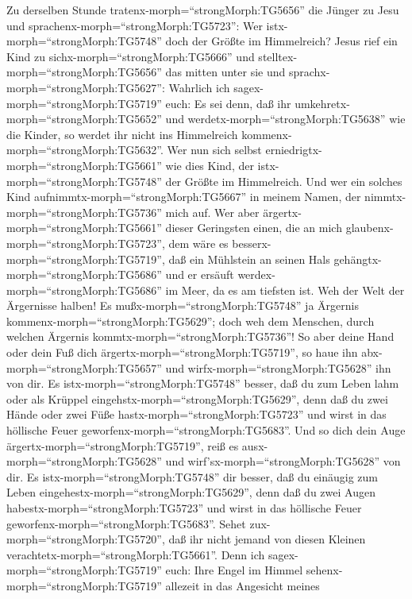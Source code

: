  Zu derselben Stunde tratenx-morph=``strongMorph:TG5656''
die Jünger zu Jesu und sprachenx-morph=``strongMorph:TG5723'': Wer
istx-morph=``strongMorph:TG5748'' doch der Größte im Himmelreich?
 Jesus rief ein Kind zu sichx-morph=``strongMorph:TG5666''
und stelltex-morph=``strongMorph:TG5656'' das mitten unter sie
 und sprachx-morph=``strongMorph:TG5627'': Wahrlich ich
sagex-morph=``strongMorph:TG5719'' euch: Es sei denn, daß ihr
umkehretx-morph=``strongMorph:TG5652'' und
werdetx-morph=``strongMorph:TG5638'' wie die Kinder, so werdet ihr nicht
ins Himmelreich kommenx-morph=``strongMorph:TG5632''.  Wer
nun sich selbst erniedrigtx-morph=``strongMorph:TG5661'' wie dies Kind,
der istx-morph=``strongMorph:TG5748'' der Größte im Himmelreich.
 Und wer ein solches Kind
aufnimmtx-morph=``strongMorph:TG5667'' in meinem Namen, der
nimmtx-morph=``strongMorph:TG5736'' mich auf.  Wer aber
ärgertx-morph=``strongMorph:TG5661'' dieser Geringsten einen, die an
mich glaubenx-morph=``strongMorph:TG5723'', dem wäre es
besserx-morph=``strongMorph:TG5719'', daß ein Mühlstein an seinen Hals
gehängtx-morph=``strongMorph:TG5686'' und er ersäuft
werdex-morph=``strongMorph:TG5686'' im Meer, da es am tiefsten ist.
 Weh der Welt der Ärgernisse halben! Es
mußx-morph=``strongMorph:TG5748'' ja Ärgernis
kommenx-morph=``strongMorph:TG5629''; doch weh dem Menschen, durch
welchen Ärgernis kommtx-morph=``strongMorph:TG5736''!  So
aber deine Hand oder dein Fuß dich ärgertx-morph=``strongMorph:TG5719'',
so haue ihn abx-morph=``strongMorph:TG5657'' und
wirfx-morph=``strongMorph:TG5628'' ihn von dir. Es
istx-morph=``strongMorph:TG5748'' besser, daß du zum Leben lahm oder als
Krüppel eingehstx-morph=``strongMorph:TG5629'', denn daß du zwei Hände
oder zwei Füße hastx-morph=``strongMorph:TG5723'' und wirst in das
höllische Feuer geworfenx-morph=``strongMorph:TG5683''.  Und
so dich dein Auge ärgertx-morph=``strongMorph:TG5719'', reiß es
ausx-morph=``strongMorph:TG5628'' und
wirf'sx-morph=``strongMorph:TG5628'' von dir. Es
istx-morph=``strongMorph:TG5748'' dir besser, daß du einäugig zum Leben
eingehestx-morph=``strongMorph:TG5629'', denn daß du zwei Augen
habestx-morph=``strongMorph:TG5723'' und wirst in das höllische Feuer
geworfenx-morph=``strongMorph:TG5683''.  Sehet
zux-morph=``strongMorph:TG5720'', daß ihr nicht jemand von diesen
Kleinen verachtetx-morph=``strongMorph:TG5661''. Denn ich
sagex-morph=``strongMorph:TG5719'' euch: Ihre Engel im Himmel
sehenx-morph=``strongMorph:TG5719'' allezeit in das Angesicht meines
